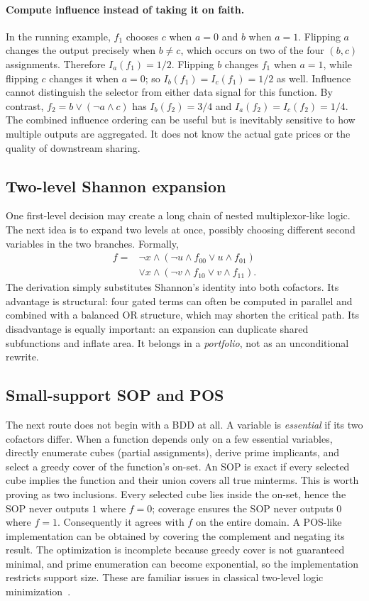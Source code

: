 \paragraph{Compute influence instead of taking it on faith.} In the running example, $f_1$ chooses $c$ when $a=0$ and $b$ when $a=1$. Flipping $a$ changes the output precisely when $b\ne c$, which occurs on two of the four $(b,c)$ assignments. Therefore $I_a(f_1)=1/2$. Flipping $b$ changes $f_1$ when $a=1$, while flipping $c$ changes it when $a=0$; so $I_b(f_1)=I_c(f_1)=1/2$ as well. Influence cannot distinguish the selector from either data signal for this function. By contrast, $f_2=b\lor(\neg a\land c)$ has $I_b(f_2)=3/4$ and $I_a(f_2)=I_c(f_2)=1/4$. The combined influence ordering can be useful but is inevitably sensitive to how multiple outputs are aggregated. It does not know the actual gate prices or the quality of downstream sharing.

\subsection{Two-level Shannon expansion}
One first-level decision may create a long chain of nested multiplexor-like logic. The next idea is to expand two levels at once, possibly choosing different second variables in the two branches. Formally,
\begin{align*}
 f={}&\neg x\land(\neg u\land f_{00}\lor u\land f_{01})\\
 &\lor x\land(\neg v\land f_{10}\lor v\land f_{11}).
\end{align*}
The derivation simply substitutes Shannon's identity into both cofactors. Its advantage is structural: four gated terms can often be computed in parallel and combined with a balanced OR structure, which may shorten the critical path. Its disadvantage is equally important: an expansion can duplicate shared subfunctions and inflate area. It belongs in a \emph{portfolio}, not as an unconditional rewrite.

\subsection{Small-support SOP and POS}
The next route does not begin with a BDD at all. A variable is \emph{essential} if its two cofactors differ. When a function depends only on a few essential variables, directly enumerate cubes (partial assignments), derive prime implicants, and select a greedy cover of the function's on-set. An SOP is exact if every selected cube implies the function and their union covers all true minterms. This is worth proving as two inclusions. Every selected cube lies inside the on-set, hence the SOP never outputs $1$ where $f=0$; coverage ensures the SOP never outputs $0$ where $f=1$. Consequently it agrees with $f$ on the entire domain. A POS-like implementation can be obtained by covering the complement and negating its result. The optimization is incomplete because greedy cover is not guaranteed minimal, and prime enumeration can become exponential, so the implementation restricts support size. These are familiar issues in classical two-level logic minimization~\cite{brayton1984}.

